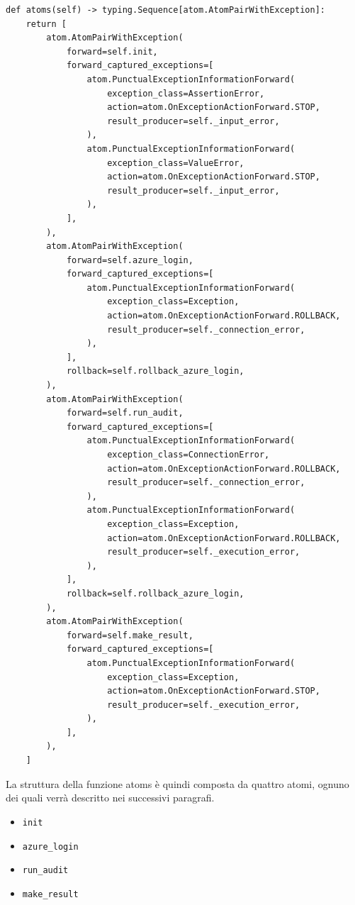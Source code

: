 \documentclass[a4paper,11pt]{report}
\begin{document}
\begin{lstlisting}[style=azcli, caption={Definizione di atoms per ogni sonda sviluppata.}, label={lst:atoms}]
def atoms(self) -> typing.Sequence[atom.AtomPairWithException]:
    return [
        atom.AtomPairWithException(
            forward=self.init,
            forward_captured_exceptions=[
                atom.PunctualExceptionInformationForward(
                    exception_class=AssertionError,
                    action=atom.OnExceptionActionForward.STOP,
                    result_producer=self._input_error,
                ),
                atom.PunctualExceptionInformationForward(
                    exception_class=ValueError,
                    action=atom.OnExceptionActionForward.STOP,
                    result_producer=self._input_error,
                ),
            ],
        ),
        atom.AtomPairWithException(
            forward=self.azure_login,
            forward_captured_exceptions=[
                atom.PunctualExceptionInformationForward(
                    exception_class=Exception,
                    action=atom.OnExceptionActionForward.ROLLBACK,
                    result_producer=self._connection_error,
                ),
            ],
            rollback=self.rollback_azure_login,
        ),
        atom.AtomPairWithException(
            forward=self.run_audit,
            forward_captured_exceptions=[
                atom.PunctualExceptionInformationForward(
                    exception_class=ConnectionError,
                    action=atom.OnExceptionActionForward.ROLLBACK,
                    result_producer=self._connection_error,
                ),
                atom.PunctualExceptionInformationForward(
                    exception_class=Exception,
                    action=atom.OnExceptionActionForward.ROLLBACK,
                    result_producer=self._execution_error,
                ),
            ],
            rollback=self.rollback_azure_login,
        ),
        atom.AtomPairWithException(
            forward=self.make_result,
            forward_captured_exceptions=[
                atom.PunctualExceptionInformationForward(
                    exception_class=Exception,
                    action=atom.OnExceptionActionForward.STOP,
                    result_producer=self._execution_error,
                ),
            ],
        ),
    ]
\end{lstlisting}

La struttura della funzione atoms è quindi composta da quattro atomi, ognuno dei quali verrà descritto nei successivi paragrafi.
\begin{itemize}
\item \texttt{init}
\item \texttt{azure\_login}
\item \texttt{run\_audit}
\item \texttt{make\_result}
\end{itemize}
\end{document}
